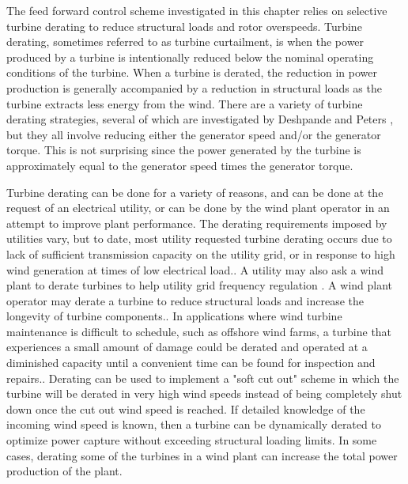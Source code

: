 The feed forward control scheme investigated in this chapter relies on selective turbine derating to reduce structural loads and rotor overspeeds. Turbine derating, sometimes referred to as turbine curtailment, is when the power produced by a turbine is intentionally reduced below the nominal operating conditions of the turbine. When a turbine is derated, the reduction in power production is generally accompanied by a reduction in structural loads as the turbine extracts less energy from the wind. There are a variety of turbine derating strategies, several of which are investigated by Deshpande and Peters \cite{deshpande2012}, but they all involve reducing either the generator speed and/or the generator torque. This is not surprising since the power generated by the turbine is approximately equal to the generator speed times the generator torque.

Turbine derating can be done for a variety of reasons, and can be done at the request of an electrical utility, or can be done by the wind plant operator in an attempt to improve plant performance. The derating requirements imposed by utilities vary, but to date, most utility requested turbine derating occurs due to lack of sufficient transmission capacity on the utility grid, or in response to high wind generation at times of low electrical load.\cite{fink2009}. A utility may also ask a wind plant to derate turbines to help utility grid frequency regulation \cite{aho2012,aho2013}. A wind plant operator may derate a turbine to reduce structural loads and increase the longevity of turbine components.\cite{biegel2013}. In applications where wind turbine maintenance is difficult to schedule, such as offshore wind farms, a turbine that experiences a small amount of damage could be derated and operated at a diminished capacity until a convenient time can be found for inspection and repairs.\cite{richards2014,griffith2015}. Derating can be used to implement a "soft cut out" scheme in which the turbine will be derated in very high wind speeds instead of being completely shut down once the cut out wind speed is reached. \cite{jelavic2013} If detailed knowledge of the incoming wind speed is known, then a turbine can be dynamically derated to optimize power capture without exceeding structural loading limits.\cite{petrovic2014,petrovic2015,jelavic2013} In some cases, derating some of the turbines in a wind plant can increase the total power production of the plant.\cite{carlen2010} 
 
